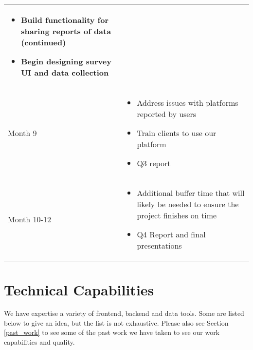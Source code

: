 \begin{table}[H]
\begin{tabularx}{\textwidth}{|l|X|}
\begin{minipage}{\linewidth}
        \vspace{6pt}
        \begin{itemize}[itemsep=3pt,parsep=-1pt,leftmargin=*]
        \item Build functionality for sharing reports of data (continued)
        \item Begin designing survey UI and data collection
        \end{itemize}
        \vspace{-2pt}
        \end{minipage}\\\hline
      Month 9 & \begin{minipage}{\linewidth}
        \vspace{6pt}
        \begin{itemize}[itemsep=3pt,parsep=-1pt,leftmargin=*]
        \item Address issues with platforms reported by users
        \item Train clients to use our platform
        \item Q3 report
        \end{itemize}
        \vspace{-2pt}
        \end{minipage}\\\hline
      Month 10-12 & \begin{minipage}{\linewidth}
        \vspace{6pt}
        \begin{itemize}[itemsep=3pt,parsep=-1pt,leftmargin=*]
        \item Additional buffer time that will likely be needed to ensure the project finishes on time
        \item Q4 Report and final presentations
        \end{itemize}
        \vspace{-2pt}
        \end{minipage}\\\hline
  \end{tabularx}
\end{table}

\clearpage
\section{Technical Capabilities}

We have expertise a variety of frontend, backend and data tools. Some are
listed below to give an idea, but the list is not exhaustive. Please also see
Section \ref{past_work} to see some of the past work we have taken to see our
work capabilities and quality.

